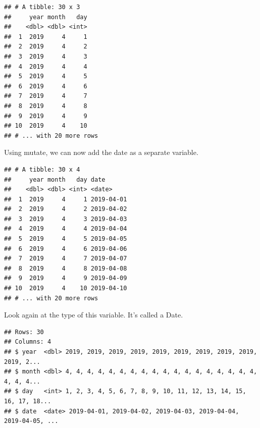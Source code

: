 \documentclass[]{tufte-book}
\newenvironment{Shaded}{}{}
\newcommand{\DataTypeTok}[1]{\textcolor[rgb]{0.56,0.13,0.00}{#1}}
\newcommand{\KeywordTok}[1]{\textcolor[rgb]{0.00,0.44,0.13}{\textbf{#1}}}
\newcommand{\NormalTok}[1]{#1}
\newcommand{\OperatorTok}[1]{\textcolor[rgb]{0.40,0.40,0.40}{#1}}
\newcommand{\StringTok}[1]{\textcolor[rgb]{0.25,0.44,0.63}{#1}}
\begin{document}
\begin{verbatim}
## # A tibble: 30 x 3
##     year month   day
##    <dbl> <dbl> <int>
##  1  2019     4     1
##  2  2019     4     2
##  3  2019     4     3
##  4  2019     4     4
##  5  2019     4     5
##  6  2019     4     6
##  7  2019     4     7
##  8  2019     4     8
##  9  2019     4     9
## 10  2019     4    10
## # ... with 20 more rows
\end{verbatim}

Using mutate, we can now add the date as a separate variable.

\begin{Shaded}
\end{Shaded}

\begin{verbatim}
## # A tibble: 30 x 4
##     year month   day date      
##    <dbl> <dbl> <int> <date>    
##  1  2019     4     1 2019-04-01
##  2  2019     4     2 2019-04-02
##  3  2019     4     3 2019-04-03
##  4  2019     4     4 2019-04-04
##  5  2019     4     5 2019-04-05
##  6  2019     4     6 2019-04-06
##  7  2019     4     7 2019-04-07
##  8  2019     4     8 2019-04-08
##  9  2019     4     9 2019-04-09
## 10  2019     4    10 2019-04-10
## # ... with 20 more rows
\end{verbatim}

Look again at the type of this variable. It's called a Date.

\begin{Shaded}
\end{Shaded}

\begin{verbatim}
## Rows: 30
## Columns: 4
## $ year  <dbl> 2019, 2019, 2019, 2019, 2019, 2019, 2019, 2019, 2019, 2019, 2...
## $ month <dbl> 4, 4, 4, 4, 4, 4, 4, 4, 4, 4, 4, 4, 4, 4, 4, 4, 4, 4, 4, 4, 4...
## $ day   <int> 1, 2, 3, 4, 5, 6, 7, 8, 9, 10, 11, 12, 13, 14, 15, 16, 17, 18...
## $ date  <date> 2019-04-01, 2019-04-02, 2019-04-03, 2019-04-04, 2019-04-05, ...
\end{verbatim}
\end{document}
